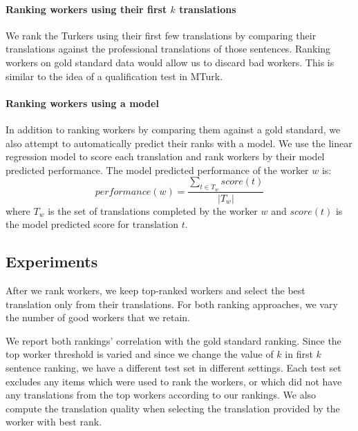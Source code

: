 \documentclass[11pt,letterpaper]{article}
\begin{document}

\paragraph{Ranking workers using their first $k$ translations}
We rank the Turkers using their first few translations by comparing their translations against the professional translations of those sentences. Ranking workers on gold standard data would allow us to discard bad workers. This is similar to the idea of a qualification test in MTurk. 

\paragraph{Ranking workers using a model}
In addition to ranking workers by comparing them against a gold standard, we also attempt to automatically predict their ranks with a model. 
We use the linear regression model to score each translation and rank workers by their model predicted performance.  
 The model predicted performance of the worker $w$ is:
\begin{equation}
performance(w) = \frac{\sum_{t \in T_{w}} score (t)}{|T_{w}|}
\end{equation}
where $T_{w} $ is the set of translations completed by the worker $w$ and  $score(t)$ is the model predicted score for translation $t$. 
 

\subsection{Experiments}

After we rank workers, we keep top-ranked workers and select the best translation only from their translations. For both ranking approaches, we vary the number of good workers that we retain. 

We report both rankings' correlation with the gold standard ranking. Since the top worker threshold is varied and since we change the value of $k$ in first $k$ sentence ranking, we have a different test set in different settings. Each test set excludes any items which were used to rank the workers, or which did not have any translations from the top workers according to our rankings. 
We also compute the translation quality when selecting the translation provided by the worker with best rank.
\end{document}
